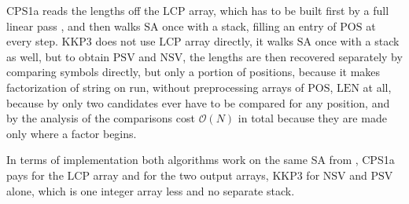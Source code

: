 CPS1a reads the lengths off the \(\mathrm{LCP}\) array, which has to be built first by a full linear pass \cite{kasai2001}, and then walks \(\mathrm{SA}\) once with a stack, filling an entry of \(\mathrm{POS}\) at every step. \(\mathrm{KKP3}\) does not use \(\mathrm{LCP}\) array directly, it walks \(\mathrm{SA}\) once with a stack as well, but to obtain \(\mathrm{PSV}\) and \(\mathrm{NSV}\), the lengths are then recovered separately by comparing symbols directly, but only a portion of positions, because it makes factorization of string on run, without preprocessing arrays of \(\mathrm{POS}\), \(\mathrm{LEN}\) at all, because by  only two candidates ever have to be compared for any position, and by the analysis of  the comparisons cost \(\mathcal{O}(N)\) in total because they are made only where a factor begins.

In terms of implementation both algorithms work on the same SA from \cite{nong2009}, CPS1a pays for the \(\mathrm{LCP}\) array and for the two output arrays, KKP3 for \(\mathrm{NSV}\) and \(\mathrm{PSV}\) alone, which is one integer array less and no separate stack.
